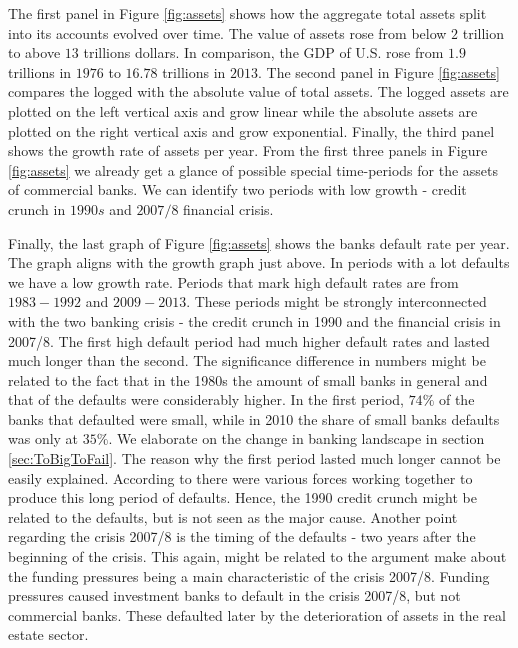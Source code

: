 \documentclass[12pt, a4paper]{article} %
\begin{document}
 
The first panel in Figure \ref{fig:assets} shows how the aggregate total assets split into its accounts evolved over time. The value of assets rose from below $2$ trillion to above $13$ trillions dollars. In comparison, the GDP of U.S. rose from $1.9$ trillions in $1976$ to $16.78$ trillions in $2013$. The second panel in Figure \ref{fig:assets} compares the logged with the absolute value of total assets. The logged assets are plotted on the left vertical axis and grow linear while the absolute assets are plotted on the right vertical axis and grow exponential. Finally, the third panel shows the growth rate of assets per year. From the first three panels in Figure \ref{fig:assets} we already get a glance of possible special time-periods for the assets of commercial banks. We can identify two periods with low growth - credit crunch in $1990s$ and $2007/8$ financial crisis. 
  


\iffalse
Finally, the last graph of Figure \ref{fig:assets} shows the banks default rate per year. The graph aligns with the growth graph just above. In periods with a lot defaults we have a low growth rate. Periods that mark high default rates are from $1983-1992$ and $2009-2013$. These periods might be strongly interconnected with the two banking crisis - the credit crunch in 1990 and the financial crisis in 2007/8. The first high default period had much higher default rates and lasted much longer than the second.
The significance difference in numbers might be related to the fact that in the 1980s the amount of small banks in general and that of the defaults were considerably higher.  In the first period, $74\%$ of the banks that defaulted were small, while in 2010 the share of small banks defaults was only at $35\%$. We elaborate on the change in banking landscape in section \ref{sec:ToBigToFail}. The reason why the first period lasted much longer cannot be easily explained. According to \citet{federal1997history} there were various forces working together to produce this long period of defaults. Hence, the 1990 credit crunch might be related to the defaults, but is not seen as the major cause.
Another point regarding the crisis 2007/8 is the timing of the defaults - two years after the beginning of the crisis. This again, might be related to the argument \citet{antoniades2019commercial} make about the funding pressures being a main characteristic of the crisis 2007/8. Funding pressures caused investment banks to default in the crisis 2007/8, but not commercial banks. These defaulted later by the deterioration of assets in the real estate sector.
\end{document}
